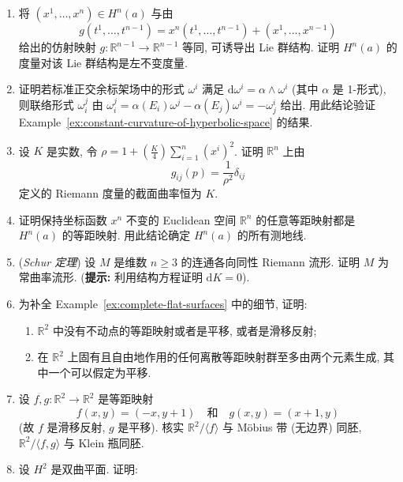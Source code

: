 \begin{RiemannExercise}\label{ex:manifolds-of-constant-curvature}
\begin{enumerate}[label=(\arabic*),ref=\arabic*,leftmargin=*]
\item\label{ex:hyperbolic-metric-as-left-invariant-metric} 将 $(x^1,\ldots,x^n)\in H^n(a)$ 与由
\[
  g(t^1,\ldots,t^{n-1})=x^n(t^1,\ldots,t^{n-1})+(x^1,\ldots,x^{n-1})
\]
给出的仿射映射 $g:\mathbb{R}^{n-1}\to\mathbb{R}^{n-1}$ 等同, 可诱导出 Lie 群结构. 证明 $H^n(a)$ 的度量对该 Lie 群结构是左不变度量.
\item\label{ex:connection-forms-for-common-one-form} 证明若标准正交余标架场中的形式 $\omega^i$ 满足 $\mathrm{d}\omega^i=\alpha\wedge\omega^i$ (其中 $\alpha$ 是 1-形式), 则联络形式 $\omega_i^j$ 由 $\omega_i^j=\alpha(E_i)\omega^j-\alpha(E_j)\omega^i=-\omega_j^i$ 给出. 用此结论验证 Example~\ref{ex:constant-curvature-of-hyperbolic-space} 的结果.
\item\label{ex:constant-curvature-of-conformal-euclidean-metric} 设 $K$ 是实数, 令 $\rho=1+(\frac K4)\sum_{i=1}^n(x^i)^2$. 证明 $\mathbb{R}^n$ 上由
\[
  g_{ij}(p)=\frac1{\rho^2}\delta_{ij}
\]
定义的 Riemann 度量的截面曲率恒为 $K$.
\item\label{ex:geodesics-of-hyperbolic-space} 证明保持坐标函数 $x^n$ 不变的 Euclidean 空间 $\mathbb{R}^n$ 的任意等距映射都是 $H^n(a)$ 的等距映射. 用此结论确定 $H^n(a)$ 的所有测地线.
\item\label{ex:schur-theorem} (\emph{Schur 定理}) 设 $M$ 是维数 $n\geq3$ 的连通各向同性 Riemann 流形. 证明 $M$ 为常曲率流形.
{\small (\textbf{提示:} 利用结构方程证明 $\mathrm{d}K=0$).}
\item\label{ex:discrete-isometry-groups-of-plane} 为补全 Example~\ref{ex:complete-flat-surfaces} 中的细节, 证明:
\begin{enumerate}[label=(\alph*),leftmargin=*]
\item $\mathbb{R}^2$ 中没有不动点的等距映射或者是平移, 或者是滑移反射;
\item 在 $\mathbb{R}^2$ 上固有且自由地作用的任何离散等距映射群至多由两个元素生成, 其中一个可以假定为平移.
\end{enumerate}
\item\label{ex:mobius-band-and-klein-bottle-quotients} 设 $f,g:\mathbb{R}^2\to\mathbb{R}^2$ 是等距映射
\[
  f(x,y)=(-x,y+1)\quad\text{和}\quad g(x,y)=(x+1,y)
\]
(故 $f$ 是滑移反射, $g$ 是平移). 核实 $\mathbb{R}^2/\langle f\rangle$ 与 Möbius 带 (无边界) 同胚, $\mathbb{R}^2/\langle f,g\rangle$ 与 Klein 瓶同胚.
\item\label{ex:orientation-preserving-isometries-of-hyperbolic-plane} 设 $H^2$ 是双曲平面. 证明:

\end{enumerate}
\end{RiemannExercise}

